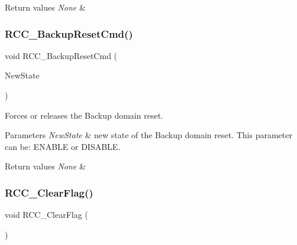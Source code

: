\begin{DoxyRetVals}{Return values}
{\em None} & \\
\hline
\end{DoxyRetVals}
\mbox{\label{group___r_c_c___exported___functions_ga636c3b72f35391e67f12a551b15fa54a}} 
\subsubsection{\texorpdfstring{RCC\_BackupResetCmd()}{RCC\_BackupResetCmd()}}
{\footnotesize\ttfamily void R\+C\+C\+\_\+\+Backup\+Reset\+Cmd (\begin{DoxyParamCaption}\item[{\mbox{\hyperlink{group___exported__types_gac9a7e9a35d2513ec15c3b537aaa4fba1}{Functional\+State}}}]{New\+State }\end{DoxyParamCaption})}



Forces or releases the Backup domain reset. 


\begin{DoxyParams}{Parameters}
{\em New\+State} & new state of the Backup domain reset. This parameter can be\+: E\+N\+A\+B\+LE or D\+I\+S\+A\+B\+LE. \\
\hline
\end{DoxyParams}

\begin{DoxyRetVals}{Return values}
{\em None} & \\
\hline
\end{DoxyRetVals}
\mbox{\label{group___r_c_c___exported___functions_ga53f909dbb15a54124419084ebda97d72}} 
\subsubsection{\texorpdfstring{RCC\_ClearFlag()}{RCC\_ClearFlag()}}
{\footnotesize\ttfamily void R\+C\+C\+\_\+\+Clear\+Flag (\begin{DoxyParamCaption}\item[{void}]{ }\end{DoxyParamCaption})}



